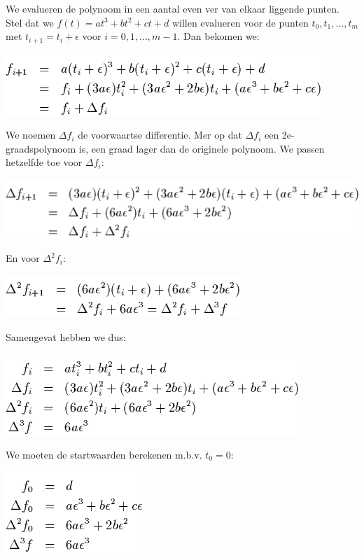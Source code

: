 \documentclass[a4paper,11pt,oneside, titlepage]{article}
\begin{document}
We evalueren de polynoom in een aantal even ver van elkaar liggende punten. Stel dat we $f(t) = a t^3 + b t^2 + c t + d$ willen evalueren voor de punten $t_0, t_1, ... , t_m$ met $t_{i+1} = t_i + \epsilon$ voor $i = 0, 1, ..., m-1$. Dan bekomen we:
\begin{center}
\includegraphics[scale=0.6]{diff1.png}
\end{center}
We noemen $\Delta f_i$ de voorwaartse differentie. Mer op dat $\Delta f_i$ een 2e-graadspolynoom is, een graad lager dan de originele polynoom. We passen hetzelfde toe voor $\Delta f_i$:
\begin{center}
\includegraphics[scale=0.6]{diff2.png}
\end{center}
En voor $\Delta^2 f_i$:
\begin{center}
\includegraphics[scale=0.6]{diff3.png}
\end{center}
Samengevat hebben we dus:
\begin{center}
\includegraphics[scale=0.6]{diff4.png}
\end{center}
We moeten de startwaarden berekenen m.b.v. $t_0 = 0$:
\begin{center}
\includegraphics[scale=0.6]{diff5.png}
\end{center}
\end{document}
